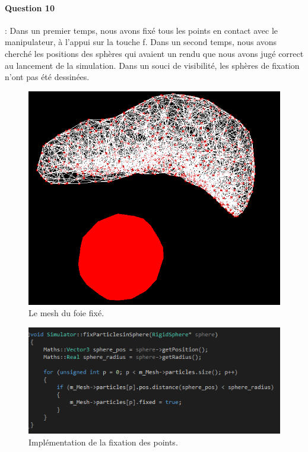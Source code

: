 \documentclass[a4paper,12pt]{article}
\begin{document}
\paragraph{Question 10} : Dans un premier temps, nous avons fixé tous les points en contact avec le manipulateur, à l'appui sur la touche \og{}f\fg{}. Dans un second temps, nous avons cherché les positions des sphères qui avaient un rendu que nous avons jugé correct au lancement de la simulation. Dans un souci de visibilité, les sphères \og{}de fixation\fg{} n'ont pas été dessinées.
\begin{figure}
  \centering
  \includegraphics{images/foie_fixe.png}
  \caption{Le mesh du foie fixé.}
  \label{fig:}
\end{figure}

\begin{figure}
  \centering
  \includegraphics{images/fixation_code.png}
  \caption{Implémentation de la fixation des points.}
  \label{fig:}
\end{figure}
\end{document}
